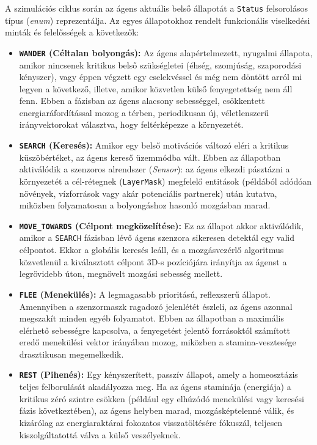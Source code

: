 A szimulációs ciklus során az ágens aktuális belső állapotát a \texttt{Status} felsorolásos típus (\textit{enum}) reprezentálja. Az egyes állapotokhoz rendelt funkcionális viselkedési minták és felelősségek a következők:

\begin{itemize}
    \item \textbf{\texttt{WANDER} (Céltalan bolyongás):} Az ágens alapértelmezett, nyugalmi állapota, amikor nincsenek kritikus belső szükségletei (éhség, szomjúság, szaporodási kényszer), vagy éppen végzett egy cselekvéssel és még nem döntött arról mi legyen a következő, illetve, amikor közvetlen külső fenyegetettség nem áll fenn. Ebben a fázisban az ágens alacsony sebességgel, csökkentett energiaráfordítással mozog a térben, periodikusan új, véletlenszerű irányvektorokat választva, hogy feltérképezze a környezetét.
    
    \item \textbf{\texttt{SEARCH} (Keresés):} Amikor egy belső motivációs változó eléri a kritikus küszöbértéket, az ágens kereső üzemmódba vált. Ebben az állapotban aktiválódik a szenzoros alrendszer (\textit{Sensor}): az ágens elkezdi pásztázni a környezetét a cél-rétegnek (\texttt{LayerMask}) megfelelő entitások (példából adódóan növények, vízforrások vagy akár potenciális partnerek) után kutatva, miközben folyamatosan a bolyongáshoz hasonló mozgásban marad.
    
    \item \textbf{\texttt{MOVE\_TOWARDS} (Célpont megközelítése):} Ez az állapot akkor aktiválódik, amikor a \texttt{SEARCH} fázisban lévő ágens szenzora sikeresen detektál egy valid célpontot. Ekkor a globális keresés leáll, és a mozgásvezérlő algoritmus közvetlenül a kiválasztott célpont 3D-s pozíciójára irányítja az ágenst a legrövidebb úton, megnövelt mozgási sebesség mellett.
    
    \item \textbf{\texttt{FLEE} (Menekülés):} A legmagasabb prioritású, reflexszerű állapot. Amennyiben a szenzormaszk ragadozó jelenlétét észleli, az ágens azonnal megszakít minden egyéb folyamatot. Ebben az állapotban a maximális elérhető sebességre kapcsolva, a fenyegetést jelentő forrásoktól számított eredő menekülési vektor irányában mozog, miközben a stamina-vesztesége drasztikusan megemelkedik.
    
    \item \textbf{\texttt{REST} (Pihenés):} Egy kényszerített, passzív állapot, amely a homeosztázis teljes felborulását akadályozza meg. Ha az ágens staminája (energiája) a kritikus zéró szintre csökken (például egy elhúzódó menekülési vagy keresési fázis következtében), az ágens helyben marad, mozgásképtelenné válik, és kizárólag az energiaraktárai fokozatos visszatöltésére fókuszál, teljesen kiszolgáltatottá válva a külső veszélyeknek.
\end{itemize}

